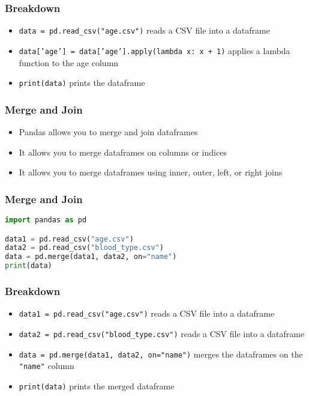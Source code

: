 \documentclass[serif, 9pt, aspectratio=32]{beamer}
\begin{document}
\begin{frame}
    \centering
    \frametitle{Breakdown}
    \begin{itemize}
        \setlength{\itemsep}{2em}
        \item \texttt{data = pd.read\_csv("age.csv")} reads a CSV file into a dataframe
        \item \texttt{data['age'] = data['age'].apply(lambda x: x + 1)} applies a lambda function to the age column
        \item \texttt{print(data)} prints the dataframe
    \end{itemize}
\end{frame}

\begin{frame}
    \centering
    \frametitle{Merge and Join}
    \begin{itemize}
        \setlength{\itemsep}{2em}
        \item Pandas allows you to merge and join dataframes
        \item It allows you to merge dataframes on columns or indices
        \item It allows you to merge dataframes using inner, outer, left, or right joins
    \end{itemize}
\end{frame}

\begin{frame}[fragile]
    \frametitle{Merge and Join}
    \begin{lstlisting}[language=Python]
import pandas as pd

data1 = pd.read_csv("age.csv")
data2 = pd.read_csv("blood_type.csv")
data = pd.merge(data1, data2, on="name")
print(data)
    \end{lstlisting}
\end{frame}

\begin{frame}
    \centering
    \frametitle{Breakdown}
    \begin{itemize}
        \setlength{\itemsep}{2em}
        \item \texttt{data1 = pd.read\_csv("age.csv")} reads a CSV file into a dataframe
        \item \texttt{data2 = pd.read\_csv("blood\_type.csv")} reads a CSV file into a dataframe
        \item \texttt{data = pd.merge(data1, data2, on="name")} merges the dataframes on the \texttt{"name"} column
        \item \texttt{print(data)} prints the merged dataframe
    \end{itemize}
\end{frame}
\end{document}
